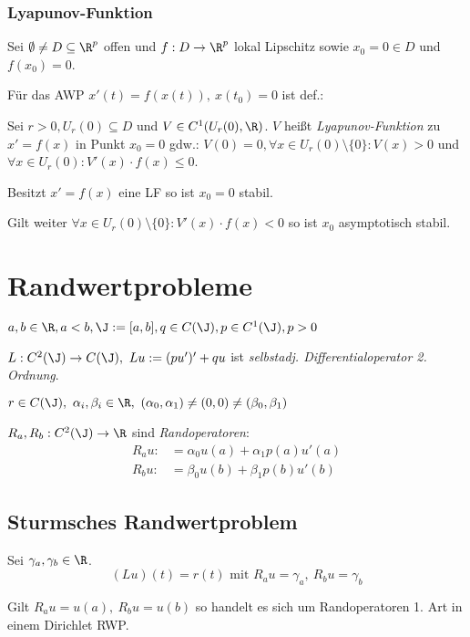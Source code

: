\subsubsection*{Lyapunov-Funktion}

Sei \(\emptyset \neq D \subseteq \R^p\) offen und \(f : D \to \R^p\) lokal Lipschitz sowie \(x_0 = 0 \in D\) und \(f(x_0)=0\).

Für das AWP \(x'(t)=f(x(t)), \ x(t_0)=0\) ist def.:

\spacing

Sei \(r > 0, U_r(0) \subseteq D\) und \(V \in C^1(U_r(0),\R)\). \(V\) heißt \emph{Lyapunov-Funktion} zu \(x'=f(x)\) in Punkt \(x_0=0\) gdw.: \(V(0)=0, \forall x \in U_r(0) \setminus \{0\} : V(x) > 0\) und \(\forall x \in U_r(0) : V'(x) \cdot f(x) \leq 0\).

\spacing

Besitzt \(x'=f(x)\) eine LF so ist \(x_0=0\) stabil.

\spacing

Gilt weiter \(\forall x \in U_r(0) \setminus \{0\} : V'(x) \cdot f(x) < 0\) so ist \(x_0\) asymptotisch stabil.

\section*{Randwertprobleme}

\(a,b \in \R, a < b, \J := [a,b], q \in C(\J), p \in C^1(\J), p > 0\)

\(L : C^2(\J) \to C(\J), \ Lu := (pu')'+qu\) ist \emph{selbstadj. Differentialoperator 2. Ordnung}.

\spacing

\(r \in C(\J), \ \alpha_i,\beta_i \in \R, \ (\alpha_0,\alpha_1) \neq (0,0) \neq (\beta_0,\beta_1)\)

\(R_a,R_b : C^2(\J) \to \R\) sind \emph{Randoperatoren}:
\begin{align*}
	R_a u :&= \alpha_0 u(a) + \alpha_1 p(a)u'(a) \\
	R_b u :&= \beta_0 u(b) + \beta_1 p(b)u'(b)
\end{align*}

\subsection*{Sturmsches Randwertproblem}

Sei \(\gamma_a, \gamma_b \in \R\). \[(Lu)(t)=r(t) \text{ mit } R_a u = \gamma_a, \ R_b u = \gamma_b\]

Gilt \(R_a u = u(a), \ R_b u = u(b)\) so handelt es sich um Randoperatoren 1. Art in einem Dirichlet RWP.

